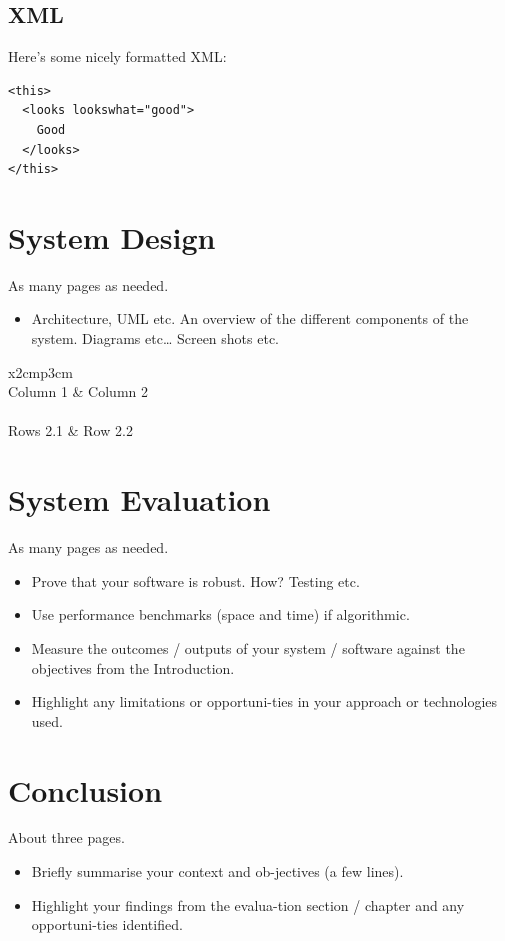 \section{XML}
Here's some nicely formatted XML:
\begin{verbatim}
<this>
  <looks lookswhat="good">
    Good
  </looks>
</this>
\end{verbatim}

\chapter{System Design}
As many pages as needed.
\begin{itemize}
\item Architecture, UML etc. An overview of the different components of the system. Diagrams etc… Screen shots etc.
\end{itemize}

\begin{table}[h]
  \centering
  \begin{tabular}{x{2cm}p{3cm}}
    \toprule \\
    Column 1 & Column 2 \\
    \midrule \\
    Rows 2.1 & Row 2.2 \\
    \bottomrule
  \end{tabular}
  \caption{A table.}
  \label{table:mytable}
\end{table}

\chapter{System Evaluation}
As many pages as needed.
\begin{itemize}
\item Prove that your software is robust. How? Testing etc. 
\item Use performance benchmarks (space and time) if algorithmic.
\item Measure the outcomes / outputs of your system / software against the objectives from the Introduction.
\item Highlight any limitations or opportuni-ties in your approach or technologies used.
\end{itemize}

\chapter{Conclusion}
About three pages.

\begin{itemize}
\item Briefly summarise your context and ob-jectives (a few lines).
\item Highlight your findings from the evalua-tion section / chapter and any opportuni-ties identified.
\end{itemize}

